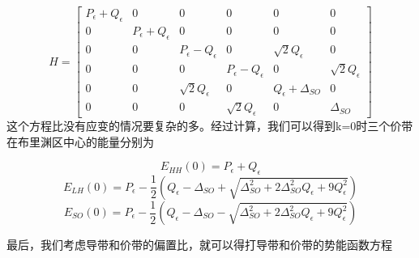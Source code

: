 \documentclass[oneside]{ZJUthesis}
\begin{document}
\begin{equation}
    H = \left[\begin{array}{cccccc}P_{\epsilon}+Q_{\epsilon} & 0 & 0 & 0 & 0 & 0 \\0 & P_{\epsilon}+Q_{\epsilon} & 0 & 0 & 0 & 0 \\0 & 0 & P_{\epsilon}-Q_{\epsilon} & 0 & \sqrt{2}Q_{\epsilon} & 0 \\0 & 0 & 0 & P_{\epsilon}-Q_{\epsilon} & 0 & \sqrt{2}Q_{\epsilon} \\0 & 0 & \sqrt{2}Q_{\epsilon} & 0 & Q_{\epsilon}+\Delta_{SO} & 0 \\0 & 0 & 0 & \sqrt{2}Q_{\epsilon} & 0 & \Delta_{SO}\end{array}\right]
\end{equation}
这个方程比没有应变的情况要复杂的多。经过计算，我们可以得到k=0时三个价带在布里渊区中心的能量分别为

\begin{equation}
    E_{HH}(0) = P_{\epsilon} + Q_{\epsilon}
\end{equation}
\begin{equation}
    E_{LH}(0) = P_{\epsilon} - \frac{1}{2} \left( Q_{\epsilon} - \Delta_{SO} + \sqrt{\Delta^2_{SO} + 2 \Delta^2_{SO} Q_{\epsilon} + 9 Q^2_{\epsilon}} \right)
\end{equation}
\begin{equation}
    E_{SO}(0) = P_{\epsilon} - \frac{1}{2} \left( Q_{\epsilon} - \Delta_{SO} - \sqrt{\Delta^2_{SO} + 2 \Delta^2_{SO} Q_{\epsilon} + 9 Q^2_{\epsilon}} \right)
\end{equation}

最后，我们考虑导带和价带的偏置比，就可以得打导带和价带的势能函数方程
\end{document}
